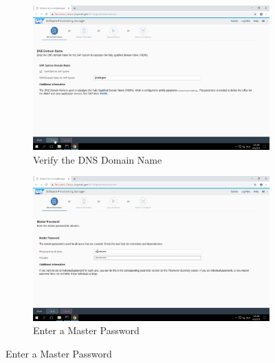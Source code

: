 \begin{figure}[!htb]\ContinuedFloat
    \begin{subfigure}{0.5\textwidth}
        \captionsetup{width=0.8\linewidth}
        \includegraphics[width=0.9\linewidth]{img/Methodologie/SAP32.png}
        \centering
        \caption{Verify the DNS Domain Name}
    \end{subfigure}
    \begin{subfigure}{0.5\textwidth}
        \captionsetup{width=0.8\linewidth}
        \includegraphics[width=0.9\linewidth]{img/Methodologie/SAP31.png} 
        \centering
        \caption{Enter a Master Password}
    \end{subfigure}
\end{figure}
